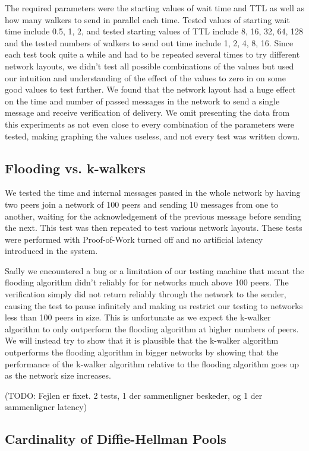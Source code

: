 The required parameters were the starting values of wait time and TTL as well as how many walkers to send in parallel each time. Tested values of starting wait time include 0.5, 1, 2, and tested starting values of TTL include 8, 16, 32, 64, 128 and the tested numbers of walkers to send out time include 1, 2, 4, 8, 16. Since each test took quite a while and had to be repeated several times to try different network layouts, we didn't test all possible combinations of the values but used our intuition and understanding of the effect of the values to zero in on some good values to test further. We found that the network layout had a huge effect on the time and number of passed messages in the network to send a single message and receive verification of delivery. We omit presenting the data from this experiments as not even close to every combination of the parameters were tested, making graphing the values useless, and not every test was written down.


\subsection{Flooding vs. k-walkers}
We tested the time and internal messages passed in the whole network by having two peers join a network of 100 peers and sending 10 messages from one to another, waiting for the acknowledgement of the previous message before sending the next. This test was then repeated to test various network layouts. These tests were performed with Proof-of-Work turned off and no artificial latency introduced in the system.

Sadly we encountered a bug or a limitation of our testing machine that meant the flooding algorithm didn't reliably for for networks much above 100 peers. The verification simply did not return reliably through the network to the sender, causing the test to pause infinitely and making us restrict our testing to networks less than 100 peers in size. This is unfortunate as we expect the k-walker algorithm to only outperform the flooding algorithm at higher numbers of peers. We will instead try to show that it is plausible that the k-walker algorithm outperforms the flooding algorithm in bigger networks by showing that the performance of the k-walker algorithm relative to the flooding algorithm goes up as the network size increases.

(TODO: Fejlen er fixet. 2 tests, 1 der sammenligner beskeder, og 1 der sammenligner latency)

\subsection{Cardinality of Diffie-Hellman Pools}

